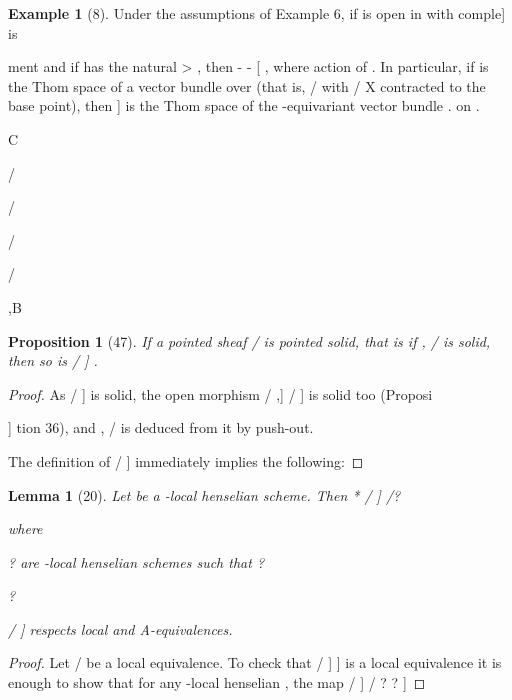 \documentclass[11pt,a4paper]{article}
\theoremstyle{plain}
\newtheorem{lemma}[theorem]{Lemma}
\newtheorem{proposition}[theorem]{Proposition}
\theoremstyle{definition}
\newtheorem{example}[theorem]{Example}
\begin{document}
\begin{example}[8]
Under the assumptions of Example 6, if is open in with comple] is

ment and if
has the natural
> , then
-
-  [  , where
action of  . In particular, if is the Thom space of a vector bundle over (that
is, / with /  X contracted to the base point), then ] is the Thom space of
the  -equivariant vector bundle .  on  .

C



/



/

/





/





,B  
\end{example}

\begin{proposition}[47]
If a pointed sheaf / is pointed solid, that is if ,
/ is solid,
then so is / ] .
\end{proposition}

\begin{proof} As / ] is solid, the open morphism / ,]
/ ] is solid too (Proposi

]
tion 36), and ,
/ is deduced from it by push-out.

The definition of / ] immediately implies the following:
\end{proof}

\begin{lemma}[20]
Let  be a -local henselian scheme. Then
*
/ ]  
/?    



where


?    are -local henselian schemes such that
? 



?   

/ ] respects local and A-equivalences.
\end{lemma}

\begin{proof} Let  /
 be a local equivalence. To check that / ]  ] is a local
equivalence it is enough to show that for any -local henselian  , the map
/ ]   /  ?    ?   ]  

\end{proof}
\end{document}
